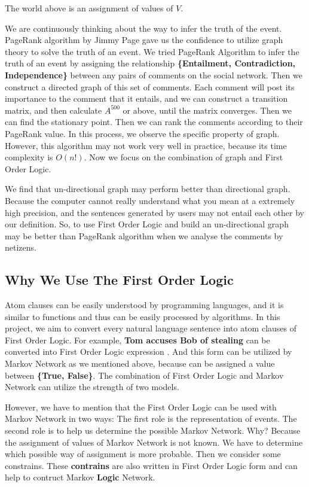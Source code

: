 \documentclass[
12pt, %
a4paper, %
oneside, %
headinclude,footinclude, %
BCOR5mm, %
]{scrartcl}
\begin{document}
The world above is an assignment of values of $V$.

We are continuously thinking about the way to infer the truth of the event. PageRank algorithm by Jimmy Page gave us the
confidence to utilize graph theory to solve the truth of an event. We tried PageRank Algorithm to infer the truth of an
event by assigning the relationship \textbf{\{Entailment, Contradiction, Independence\}} between any pairs of comments on
the social network. Then we construct a directed graph of this set of comments. Each comment will post its importance to
the comment that it entails, and we can construct a transition matrix, and then calculate $A^{500}$ or above, until the matrix
converges. Then we can find the stationary point. Then we can rank the comments according to their PageRank value. In this process,
we observe the specific property of graph. However, this algorithm may not work very well in practice, because its time complexity is $O(n!)$. 
Now we focus on the combination of graph and First Order Logic. 

We find that un-directional graph may perform better than directional graph. Because the computer cannot really understand what you mean at a extremely high
precision, and the sentences generated by users may not entail each other by our definition. So, to use First Order Logic and build an un-directional graph may be better than PageRank algorithm when we analyse the comments by netizens.

\subsection{Why We Use The First Order Logic}
Atom clauses can be easily understood by programming languages, and it is similar to functions and thus can be easily processed by algorithms. In this project, we aim to convert every natural language sentence into atom clauses of First Order Logic. For example, \textbf{Tom accuses Bob of stealing} can be converted into First Order Logic expression \textbf{}. And this form can be utilized by Markov Network as we mentioned above, because \textbf{} can be assigned a value between \textbf{\{True, False\}}. The combination of First Order Logic and Markov Network can utilize the strength of two models.

However, we have to mention that the First Order Logic can be used with Markov Network in two ways: The first role is the representation of events. The second role is to help us determine the possible Markov Network. Why? Because the assignment of values of Markov Network is not known. We have to determine which possible way of assignment is more probable. Then we consider some constrains. These \textbf{contrains} are also written in First Order Logic form and can help to contruct Markov \textbf{Logic} Network. 
\end{document}
